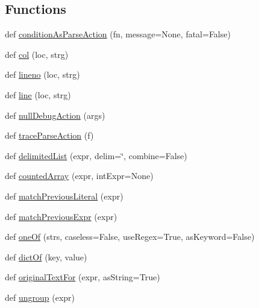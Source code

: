 \subsection*{Functions}
\begin{DoxyCompactItemize}
\item 
def \hyperlink{namespacepip_1_1__vendor_1_1pyparsing_aa03cee88987045f2dfc3051da2ef3c94}{condition\+As\+Parse\+Action} (fn, message=None, fatal=False)
\item 
def \hyperlink{namespacepip_1_1__vendor_1_1pyparsing_a2c6cb653b8a52ff379699c1d5042839b}{col} (loc, strg)
\item 
def \hyperlink{namespacepip_1_1__vendor_1_1pyparsing_a3d1206ac2f1a6527c6e08b2aaf9014d4}{lineno} (loc, strg)
\item 
def \hyperlink{namespacepip_1_1__vendor_1_1pyparsing_a3552074303cfd44e5dd8e99f0a113b12}{line} (loc, strg)
\item 
def \hyperlink{namespacepip_1_1__vendor_1_1pyparsing_a76237e0aef3ce1c4789118b9ec72eac0}{null\+Debug\+Action} (args)
\item 
def \hyperlink{namespacepip_1_1__vendor_1_1pyparsing_a2f85833494e24217e5b6c2ed99869e13}{trace\+Parse\+Action} (f)
\item 
def \hyperlink{namespacepip_1_1__vendor_1_1pyparsing_ae66a259824813f0672a0ae6cddad1e51}{delimited\+List} (expr, delim=\char`\"{},  combine=False)
\item 
def \hyperlink{namespacepip_1_1__vendor_1_1pyparsing_a816c52a4cc16b28c70763dd61e83db71}{counted\+Array} (expr, int\+Expr=None)
\item 
def \hyperlink{namespacepip_1_1__vendor_1_1pyparsing_a76f0527928378c1b0f6661b1f8a3e893}{match\+Previous\+Literal} (expr)
\item 
def \hyperlink{namespacepip_1_1__vendor_1_1pyparsing_ade8413ec69fef4e6c7b623a706e78126}{match\+Previous\+Expr} (expr)
\item 
def \hyperlink{namespacepip_1_1__vendor_1_1pyparsing_a5f0669a4c9ed43ca389afbffeebec19b}{one\+Of} (strs, caseless=False, use\+Regex=True, as\+Keyword=False)
\item 
def \hyperlink{namespacepip_1_1__vendor_1_1pyparsing_abd1e06b7d4ce771fea15e9f5269438c2}{dict\+Of} (key, value)
\item 
def \hyperlink{namespacepip_1_1__vendor_1_1pyparsing_ac65e1285d71fa054708a263df195611f}{original\+Text\+For} (expr, as\+String=True)
\item 
def \hyperlink{namespacepip_1_1__vendor_1_1pyparsing_a4639e2ccbda5a99246c2d3110bc44dd6}{ungroup} (expr)

\end{DoxyCompactItemize}
